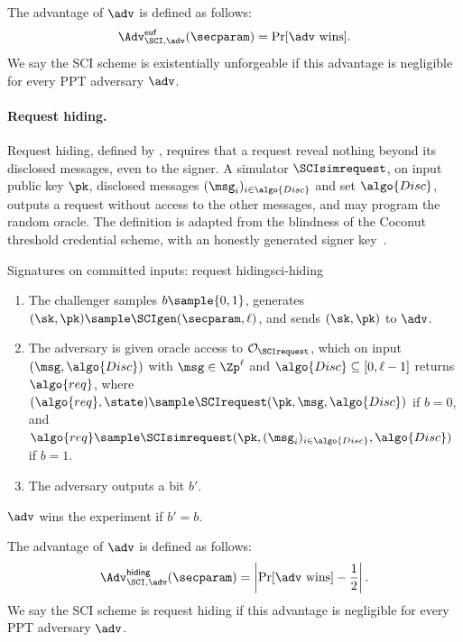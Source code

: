 The advantage of $\adv$ is defined as follows:
%
\begin{equation*}
%
  \Adv^{\mathsf{euf}}_{\SCI, \adv}(\secparam) = \Pr[\adv\text{ wins}].
%
\end{equation*}
%
We say the SCI scheme is existentially unforgeable if this advantage is
negligible for every PPT adversary $\adv$.

\paragraph{Request hiding.} Request hiding, defined by ,
requires that a request reveal nothing beyond its disclosed messages, even to
the signer. A simulator $\SCIsimrequest$, on input public key $\pk$, disclosed
messages $(\msg_i)_{i \in \algo{Disc}}$ and set $\algo{Disc}$, outputs a
request without access to the other messages, and may program the random
oracle. The definition is adapted from the blindness of the Coconut threshold
credential scheme, with an honestly generated signer key~\cite{NDSS:SABMD19}.

\begin{experimentbox}{Signatures on committed inputs: request hiding}{sci-hiding}

  \begin{enumerate}

    \item The challenger samples $b \sample \{0,1\}$, generates $(\sk, \pk)
\sample \SCIgen(\secparam, \ell)$, and sends $(\sk, \pk)$ to $\adv$.

    \item The adversary is given oracle access to $\mathcal{O}_{\SCIrequest}$,
which on input $(\msg, \algo{Disc})$ with $\msg \in \Zp^\ell$ and $\algo{Disc}
\subseteq [0, \ell-1]$ returns $\algo{req}$, where $(\algo{req}, \state) \sample
\SCIrequest(\pk, \msg, \algo{Disc})$ if $b = 0$, and $\algo{req} \sample
\SCIsimrequest(\pk, (\msg_i)_{i \in \algo{Disc}}, \algo{Disc})$ if $b
= 1$.

    \item The adversary outputs a bit $b'$.

  \end{enumerate}

  $\adv$ wins the experiment if $b' = b$.

\end{experimentbox}

The advantage of $\adv$ is defined as follows:
%
\begin{equation*}
%
  \Adv^{\mathsf{hiding}}_{\SCI, \adv}(\secparam) = \left| \Pr[\adv\text{
wins}] - \frac{1}{2} \right|.
%
\end{equation*}
%
We say the SCI scheme is request hiding if this advantage is negligible for
every PPT adversary $\adv$.

